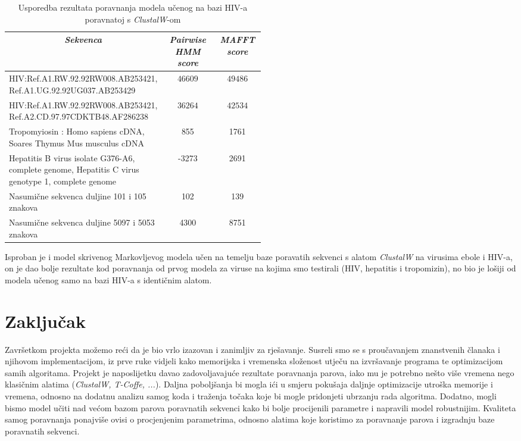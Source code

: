 \documentclass[a4paper]{article}
\begin{document}
\begin{table}[H]
\centering
\begin{tabular}{|p{0.5\linewidth}|c| c|}
\hline
\multicolumn{1}{|c|}{\textit{\textbf{Sekvenca}}} & \multicolumn{1}{c|}{\textit{\textbf{Pairwise HMM score }}} & \multicolumn{1}{c|}{\textit{\textbf{MAFFT score}}}                                      \tabularnewline \hline
HIV:Ref.A1.RW.92.92RW008.AB253421, Ref.A1.UG.92.92UG037.AB253429 & $46609$ & $49486$  \\ \hline
HIV:Ref.A1.RW.92.92RW008.AB253421, Ref.A2.CD.97.97CDKTB48.AF286238 & $36264$ & $42534$  \\ \hline
Tropomyiosin : Homo sapiens cDNA, Soares Thymus Mus musculus cDNA & 855 & 1761 \\ \hline
Hepatitis B virus isolate G376-A6, complete genome, Hepatitis C virus genotype 1, complete genome  &-3273 & 2691 \\ \hline
Nasumične sekvenca duljine 101 i 105 znakova  & 102 & 139 \\\hline
Nasumične sekvenca duljine 5097 i 5053 znakova  & 4300 & 8751 \\\hline

\end{tabular}
\caption{Usporedba rezultata poravnanja modela učenog na bazi HIV-a poravnatoj s \textit{ClustalW}-om }
\label{table:bazaHiv}   
\end{table}
Isproban je i model skrivenog Markovljevog modela učen na temelju baze poravatih sekvenci s alatom \textit{ClustalW} na virusima ebole i HIV-a, on je dao bolje rezultate kod poravnanja od prvog modela za viruse na kojima smo testirali (HIV, hepatitis i tropomizin), no bio je lošiji od modela učenog samo na bazi HIV-a s identičnim alatom.
\newpage
\section{Zaključak}
Završetkom projekta možemo reći da je bio vrlo izazovan i zanimljiv za rješavanje. Susreli smo se s proučavanjem znanstvenih članaka i njihovom implementacijom, iz prve ruke vidjeli kako memorijska i vremenska složenost utječu na izvršavanje programa te optimizacijom samih algoritama. Projekt je naposlijetku davao zadovoljavajuće rezultate poravnanja parova, iako mu je potrebno nešto više vremena nego klasičnim alatima (\textit{ClustalW, T-Coffe, ...}). Daljna poboljšanja bi mogla ići u smjeru pokušaja daljnje optimizacije utroška memorije i vremena, odnosno na dodatnu analizu samog koda i traženja točaka koje bi mogle pridonjeti ubrzanju rada algoritma. Dodatno, mogli bismo model učiti nad većom bazom parova poravnatih sekvenci kako bi bolje procijenili parametre  i napravili model robustnijim. Kvaliteta samog poravnanja ponajviše ovisi o procjenjenim parametrima, odnosno alatima koje koristimo za poravnanje parova i izgradnju baze poravnatih sekvenci. 
\newpage
\end{document}
